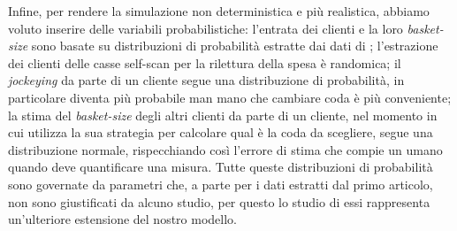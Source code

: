 Infine, per rendere la simulazione non deterministica e più realistica, abbiamo voluto inserire delle variabili probabilistiche: l'entrata dei clienti e la loro \textit{basket-size} sono basate su distribuzioni di probabilità estratte dai dati di \cite{article1}; l'estrazione dei clienti delle casse self-scan per la rilettura della spesa è randomica; il \textit{jockeying} da parte di un cliente segue una distribuzione di probabilità, in particolare diventa più probabile man mano che cambiare coda è più conveniente; la stima del \textit{basket-size} degli altri clienti da parte di un cliente, nel momento in cui utilizza la sua strategia per calcolare qual è la coda da scegliere, segue una distribuzione normale, rispecchiando così l'errore di stima che compie un umano quando deve quantificare una misura. Tutte queste distribuzioni di probabilità sono governate da parametri che, a parte per i dati estratti dal primo articolo, non sono giustificati da alcuno studio, per questo lo studio di essi rappresenta un'ulteriore estensione del nostro modello.